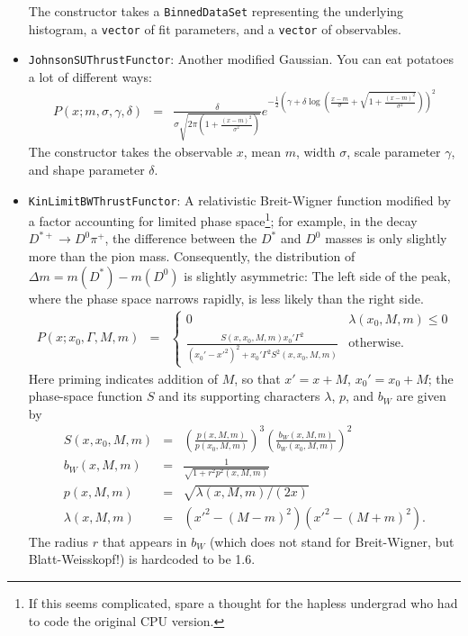 \documentclass[12pt,pdflatex]{article}
\begin{document}
\begin{itemize}
The constructor takes a \texttt{BinnedDataSet} representing the underlying histogram, 
a \texttt{vector} of fit parameters, and a \texttt{vector} of observables. 
\item \texttt{JohnsonSUThrustFunctor}: Another modified Gaussian. You can eat potatoes
a lot of different ways:
\begin{eqnarray}
P(x;m,\sigma,\gamma,\delta) &=&
\frac{\delta}{\sigma\sqrt{2\pi(1+\frac{(x-m)^2}{\sigma^2})}}
e^{-\frac{1}{2}\left(\gamma + \delta\log(\frac{x-m}{\sigma}+\sqrt{1+\frac{(x-m)^2}{\sigma^2}})\right)^2}
\end{eqnarray}
The constructor takes the observable $x$, mean $m$, width $\sigma$, 
scale parameter $\gamma$, and shape parameter $\delta$. 
\item \texttt{KinLimitBWThrustFunctor}: A relativistic Breit-Wigner function modified 
by a factor accounting for limited phase space\footnote{If this seems complicated, spare a thought for the hapless undergrad who
had to code the original CPU version.}; for example, in the decay $D^{*+}\to D^0\pi^+$,
the difference between the $D^*$ and $D^0$ masses is only slightly more than the pion mass.
Consequently, the distribution of $\Delta m = m(D^*) - m(D^0)$ is slightly asymmetric: The left
side of the peak, where the phase space narrows rapidly, is less likely than the right side.
\begin{eqnarray}
P(x;x_0,\Gamma,M,m) &=& \left\{ \begin{matrix}
0 & \lambda(x_0,M,m) \le 0 \\
\frac{S(x,x_0,M,m)x_0'\Gamma^2}{\left(x_0'-x'^2\right)^2 + x_0'\Gamma^2S^2(x,x_0,M,m)} & \mathrm{otherwise.}
\end{matrix}
\right. 
\end{eqnarray}
Here priming indicates addition of $M$, so that
$x'=x+M$, $x_0'=x_0+M$; the phase-space function $S$ and its supporting characters $\lambda$, $p$, and $b_W$ are given by
\begin{eqnarray}
S(x,x_0,M,m)   &=& \left(\frac{p(x,M,m)}{p(x_0,M,m)}\right)^3\left(\frac{b_W(x,M,m)}{b_W(x_0,M,m)}\right)^2 \\
b_W(x,M,m)     &=& \frac{1}{\sqrt{1 + r^2p^2(x,M,m)}}\\
p(x,M,m)       &=& \sqrt{\lambda(x,M,m)/(2x)}\\
\lambda(x,M,m) &=& \left(x'^2-(M-m)^2\right)\left(x'^2-(M+m)^2\right).
\end{eqnarray}
The radius $r$ that appears in $b_W$ (which does not stand for Breit-Wigner,
but Blatt-Weisskopf!) is hardcoded to be 1.6. 


\end{itemize}
\end{document}
